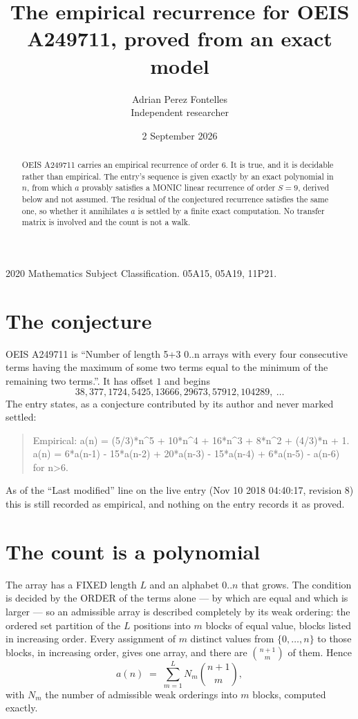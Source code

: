 \documentclass[11pt,a4paper]{article}
\title{The empirical recurrence for OEIS A249711, proved from an exact model}
\author{Adrian Perez Fontelles\\ \small Independent researcher}
\date{2 September 2026}
\theoremstyle{plain}
\theoremstyle{definition}
\begin{document}
\maketitle

\begin{abstract}
OEIS A249711 carries an empirical recurrence of order $6$. It is true, and it is
decidable rather than empirical. The entry's sequence is given exactly by an exact polynomial in $n$, from
which $a$ provably satisfies a MONIC linear recurrence of order $S=9$, derived below and not
assumed. The residual of the conjectured recurrence satisfies the same one, so whether it
annihilates $a$ is settled by a finite exact computation. No transfer matrix is involved and
the count is not a walk.
\end{abstract}

\noindent\small 2020 Mathematics Subject Classification. 05A15, 05A19, 11P21.\normalsize

\section{The conjecture}

OEIS A249711 is ``Number of length 5+3 0..n arrays with every four consecutive terms having the maximum of some two terms equal to the minimum of the remaining two terms.''. It has offset $1$ and begins
\[
38, 377, 1724, 5425, 13666, 29673, 57912, 104289,\ \dots
\]
The entry states, as a conjecture contributed by its author and never marked settled:
\begin{quote}
Empirical: a(n) = (5/3)*n\^{}5 + 10*n\^{}4 + 16*n\^{}3 + 8*n\^{}2 + (4/3)*n + 1. a(n) = 6*a(n-1) - 15*a(n-2) + 20*a(n-3) - 15*a(n-4) + 6*a(n-5) - a(n-6) for n>6.
\end{quote}
As of the ``Last modified'' line on the live entry (Nov 10 2018 04:40:17, revision 8)
this is still recorded as empirical, and nothing on the entry records it as proved.

\section{The count is a polynomial}

The array has a FIXED length $L$ and an alphabet $0..n$ that grows. The condition is decided by
the ORDER of the terms alone --- by which are equal and which is larger --- so an admissible
array is described completely by its weak ordering: the ordered set partition of the $L$
positions into $m$ blocks of equal value, blocks listed in increasing order. Every assignment
of $m$ distinct values from $\{0,\dots,n\}$ to those blocks, in increasing order, gives one
array, and there are $\binom{n+1}{m}$ of them. Hence
\[
a(n)\;=\;\sum_{m=1}^{L} N_m\binom{n+1}{m},
\]
with $N_m$ the number of admissible weak orderings into $m$ blocks, computed exactly.
\end{document}

